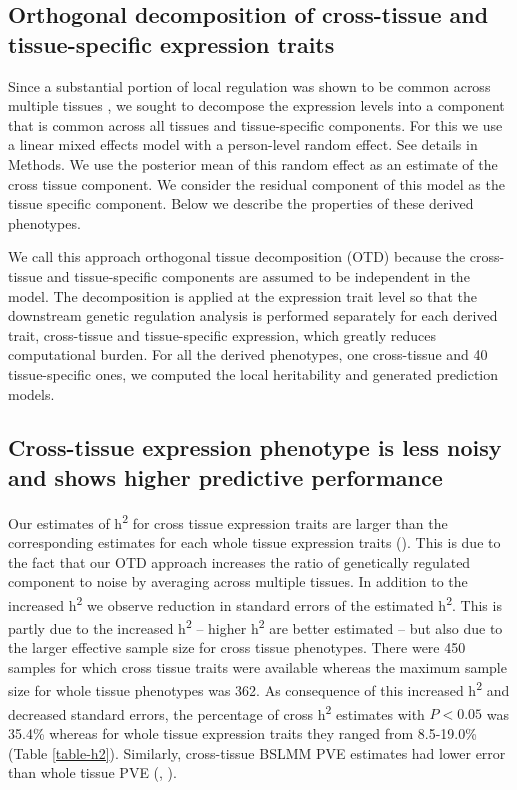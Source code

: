 \documentclass[10pt,letterpaper]{article}
\begin{document}
\subsection*{Orthogonal decomposition of cross-tissue and tissue-specific expression traits}

Since a substantial portion of local regulation was shown to be common across multiple tissues \cite{Ardlie_2015}, we sought to decompose the expression levels into a component that is common across all tissues and tissue-specific components. For this we use a linear mixed effects model with a person-level random effect. See details in Methods. We use the posterior mean of this random effect as an estimate of the cross tissue component. We consider the residual component of this model as the tissue specific component. Below we describe the properties of these derived phenotypes.

We call this approach orthogonal tissue decomposition (OTD) because the cross-tissue and tissue-specific components are assumed to be independent in the model. The decomposition is applied at the expression trait level so that the downstream genetic regulation analysis is performed separately for each derived trait, cross-tissue and tissue-specific expression, which greatly reduces computational burden. For all the derived phenotypes, one cross-tissue and 40 tissue-specific ones, we computed the local heritability and generated prediction models.

\subsection*{Cross-tissue expression phenotype is less noisy and shows higher predictive performance}%

Our estimates of h\textsuperscript{2} for cross tissue expression traits are larger than the corresponding estimates for each whole tissue expression traits ().
This is due to the fact that our OTD approach increases the ratio of genetically regulated component to noise by averaging across multiple tissues. In addition to the increased h\textsuperscript{2} we observe reduction in standard errors of the estimated h\textsuperscript{2}. This is partly due to the increased h\textsuperscript{2} -- higher h\textsuperscript{2} are better estimated -- but also due to the larger effective sample size for cross tissue phenotypes. There were 450 samples for which cross tissue traits were available whereas the maximum sample size for whole tissue phenotypes was 362. As consequence of this increased h\textsuperscript{2} and decreased standard errors, the percentage of cross h\textsuperscript{2} estimates with $P < 0.05$ was 35.4\% whereas for whole tissue expression traits they ranged from 8.5-19.0\% (Table \ref{table-h2}). Similarly, cross-tissue BSLMM PVE estimates had lower error than whole tissue PVE (, ). 
\end{document}
